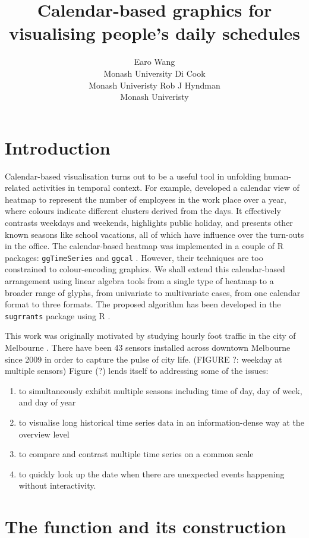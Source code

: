 \documentclass[article]{jss}
\author{
Earo Wang\\Monash University \And Di Cook\\Monash Univeristy \And Rob J Hyndman\\Monash Univeristy
}
\title{Calendar-based graphics for visualising people's daily schedules}
\providecommand{\tightlist}{%
  \setlength{\itemsep}{0pt}\setlength{\parskip}{0pt}}
\begin{document}
\section{Introduction}\label{introduction}

Calendar-based visualisation turns out to be a useful tool in unfolding
human-related activities in temporal context. For example,
\citet{VanWijkCluster1999} developed a calendar view of heatmap to
represent the number of employees in the work place over a year, where
colours indicate different clusters derived from the days. It
effectively contrasts weekdays and weekends, highlights public holiday,
and presents other known seasons like school vacations, all of which
have influence over the turn-outs in the office. The calendar-based
heatmap was implemented in a couple of R packages: \texttt{ggTimeSeries}
\citep{R-ggTimeSeries} and \texttt{ggcal} \citep{R-ggcal}. However,
their techniques are too constrained to colour-encoding graphics. We
shall extend this calendar-based arrangement using linear algebra tools
from a single type of heatmap to a broader range of glyphs, from
univariate to multivariate cases, from one calendar format to three
formats. The proposed algorithm has been developed in the
\texttt{sugrrants} package \citep{R-sugrrants} using R \citep{R-base}.

This work was originally motivated by studying hourly foot traffic in
the city of Melbourne \citep{ped}. There have been 43 sensors installed
across downtown Melbourne since 2009 in order to capture the pulse of
city life. (FIGURE ?: weekday at multiple sensors) Figure (?) lends
itself to addressing some of the issues:

\begin{enumerate}
\def\labelenumi{\arabic{enumi}.}
\tightlist
\item
  to simultaneously exhibit multiple seasons including time of day, day
  of week, and day of year
\item
  to visualise long historical time series data in an information-dense
  way at the overview level
\item
  to compare and contrast multiple time series on a common scale
\item
  to quickly look up the date when there are unexpected events happening
  without interactivity.
\end{enumerate}

\section{The function and its
construction}\label{the-function-and-its-construction}
\end{document}
